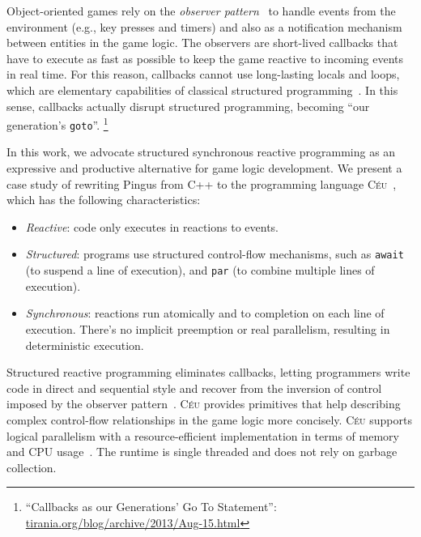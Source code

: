 \documentclass{vgtc}                          %
\newcommand{\CEU}{\textsc{C\'{e}u}\xspace}
\newcommand{\code}[1] {{\small{\texttt{#1}}}}
\begin{document}

Object-oriented games rely on the \emph{observer pattern}~\cite{games.patterns}
to handle events from the environment (e.g., key presses and timers) and also
as a notification mechanism between entities in the game logic.
%
The observers are short-lived callbacks that have to execute as fast as
possible to keep the game reactive to incoming events in real time.
%
For this reason, callbacks cannot use long-lasting locals and loops, which are
elementary capabilities of classical structured
programming~\cite{rp.deprecating,rp.rescala,sync_async.cooperative}.
%
In this sense, callbacks actually disrupt structured programming, becoming
``our generation's \code{goto}''.%
\footnote{``Callbacks as our Generations' Go To Statement'':
\url{tirania.org/blog/archive/2013/Aug-15.html}}

In this work, we advocate structured synchronous reactive programming as an
expressive and productive alternative for game logic development.
We present a case study of rewriting Pingus from C++ to the programming
language \CEU~\cite{ceu.sensys13,ceu.mod15}, which has the following
characteristics:
%
\begin{itemize}
\item \emph{Reactive}: code only executes in reactions to events.
\item \emph{Structured}: programs use structured control-flow mechanisms, such
      as \code{await} (to suspend a line of execution), and \code{par} (to
      combine multiple lines of execution).
\item \emph{Synchronous}: reactions run atomically and to completion on each
      line of execution.
      There's no implicit preemption or real parallelism, resulting in
      deterministic execution.
\end{itemize}
%
Structured reactive programming eliminates callbacks, letting programmers write
code in direct and sequential style and recover from the inversion of control
imposed by the observer pattern~\cite{rp.deprecating}.
%
\CEU provides primitives that help describing complex control-flow
relationships in the game logic more concisely.
%
\CEU supports logical parallelism with a resource-efficient implementation in
terms of memory and CPU usage~\cite{ceu.sensys13}.
The runtime is single threaded and does not rely on garbage collection.
\end{document}
